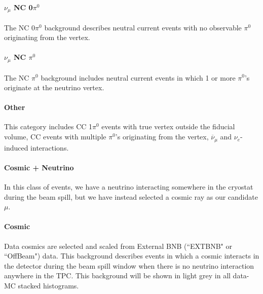 \paragraph{  $\nu_\mu$ NC 0$\pi^0$}
The NC 0$\pi^0$ background describes neutral current events with no observable $\pi^0$ originating from the vertex.  


\paragraph{  $\nu_\mu$ NC $\pi^0$}
The NC $\pi^0$ background includes neutral current events in which 1 or more $\pi^0$'s originate at the neutrino vertex.  


\paragraph{ Other}
This category includes CC 1$\pi^0$ events with true vertex outside the fiducial volume, CC events with multiple $\pi^0$'s originating from the vertex, $\overline{\nu}_\mu$ and $\nu_e$-induced interactions. 

\paragraph{ Cosmic + Neutrino }
In this class of events, we have a neutrino interacting somewhere in the cryostat during the beam spill, but we have instead selected a cosmic ray as our candidate $\mu$. 

\paragraph{Cosmic }
Data cosmics are selected and scaled from External BNB (``EXTBNB" or ``OffBeam") data.  This background describes events in which a cosmic interacts in the detector during the beam spill window when there is no neutrino interaction anywhere in the TPC.  This background will be shown in light grey in all data-MC stacked histograms.


